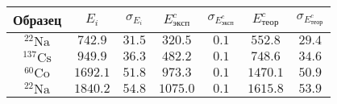\begin{tabular}{| c | c | c | c | c | c | c |}
\hline
Образец & $E_i$ & $\sigma_{E_i}$ & $E^c_{\text{эксп}}$ & $\sigma_{E^c_{\text{эксп}}}$ & $E^c_{\text{теор}}$ & $\sigma_{E^c_{\text{теор}}}$\\
\hline
$^{22}\text{Na}$ & $742.9$ & $31.5$ & $320.5$ & $0.1$ & $552.8$ & $29.4$\\
\hline
$^{137}\text{Cs}$ & $949.9$ & $36.3$ & $482.2$ & $0.1$ & $748.6$ & $34.6$\\
\hline
$^{60}\text{Co}$ & $1692.1$ & $51.8$ & $973.3$ & $0.1$ & $1470.1$ & $50.9$\\
\hline
$^{22}\text{Na}$ & $1840.2$ & $54.8$ & $1075.0$ & $0.1$ & $1615.8$ & $53.9$\\
\hline
\end{tabular}
